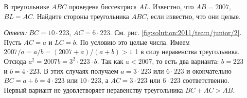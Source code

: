В треугольнике $ABC$ проведена биссектриса $AL$.
Известно, что $AB = 2007$, $BL = AC$.
Найдите стороны треугольника $ABC$, если известно, что они целые.

%
\label{solution:2011/team/junior/2}%
\emph{Ответ:} $BC = 10 \cdot 223$, $AC = 6 \cdot 223$.
См. рис. \ref{fig:solution:2011/team/junior/2}.
Пусть $AC = a$ и $LC = b$.
По условию это целые числа.
Имеем $2007 / a = a / b = (2007 + a) / (a + b) > 1$ 1 в силу неравенства
треугольника.
Отсюда $a^2 = 2007 b = 3^2 \cdot 223 \cdot b$.
Так как  $a < 2007$, то есть два варианта:
$b = 223$ и $b = 4 \cdot 223$.
В этих случаях получаем $a = 3 \cdot 223$ или $6 \cdot 223$ и окончательно
$BC = a + b = 4 \cdot 223$ или $10 \cdot 223$, а $AC = 3 \cdot 223$ или
$6 \cdot 223$ соответственно.
Первый вариант не удовлетворяет неравенству треугольника $BC + AC > AB$.

